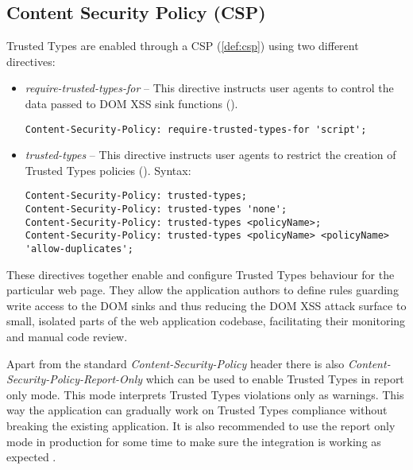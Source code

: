 \subsection{Content Security Policy (CSP)}
\label{csp}

Trusted Types are enabled through a CSP (\ref{def:csp}) using two different directives:

\begin{itemize}
  \item \textit{require-trusted-types-for} -- This directive instructs user agents to control the
        data passed to DOM XSS sink functions (\cite{mdn:require-trusted-types-for}).

        \bigskip
        \begin{lstlisting}[language={}, caption=Syntax of require-trusted-types-for directive]
Content-Security-Policy: require-trusted-types-for 'script';\end{lstlisting}

  \item \textit{trusted-types} -- This directive instructs user agents to restrict the creation of
        Trusted Types policies (\cite{mdn:trusted-types}). Syntax:

        \bigskip
        \begin{lstlisting}[language={}, caption=Syntax of trusted-types directive]
Content-Security-Policy: trusted-types;
Content-Security-Policy: trusted-types 'none';
Content-Security-Policy: trusted-types <policyName>;
Content-Security-Policy: trusted-types <policyName> <policyName> 'allow-duplicates';\end{lstlisting}

\end{itemize}

These directives together enable and configure Trusted Types behaviour for the particular web page.
They allow the application authors to define rules guarding write access to the DOM sinks and thus
reducing the DOM XSS attack surface to small, isolated parts of the web application codebase,
facilitating their monitoring and manual code review.

Apart from the standard \textit{Content-Security-Policy} header there is also
\textit{Content-Security-Policy-Report-Only} which can be used to enable Trusted Types in report
only mode. This mode interprets Trusted Types violations only as warnings. This way the application
can gradually work on Trusted Types compliance without breaking the existing application. It is also
recommended to use the report only mode in production for some time to make sure the integration is
working as expected \cite{tt_web_framework_paper}.

